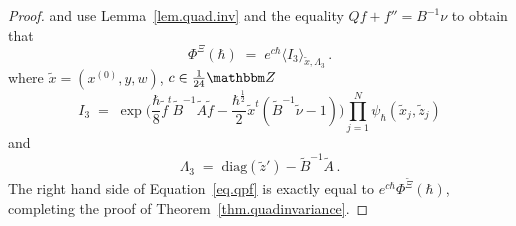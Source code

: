 \documentclass[12pt,reqno]{amsart}
\theoremstyle{definition}
\def\BZ{\mathbbm Z}
\def\be{\begin{equation}}
\def\ee{\end{equation}}
\def\diag{\mathrm{diag}}
\renewcommand{\=}{\;=\;}
\newcommand{\hsqrt}{\hbar^{\frac{1}{2}}}
\begin{document}
\begin{proof}
and use Lemma~\ref{lem.quad.inv} and
the equality $Qf+f''=B^{-1}\nu$
to obtain that 
\be
\label{eq.qpf}
\Phi^{\Xi}(\hbar) \= e^{c\hbar}\langle I_3 \rangle_{\widetilde{x}, \Lambda_3}\,.
\ee
where $\widetilde{x}=(x^{(0)},y,w)$, $c\in\frac{1}{24}\BZ$
\begin{equation*}
I_3 \= \exp\Big(\frac\hbar8 \widetilde{f}^t \widetilde{B}^{-1}\widetilde{A}
\widetilde{f}
-\frac{\hsqrt}2 \widetilde{x}^t(\widetilde{B}^{-1}\widetilde{\nu}-1)\Big)
\prod_{j=1}^N \psi_{\hbar}(\widetilde{x}_j,\widetilde{z}_j)
\end{equation*}
and
\begin{equation*}
\Lambda_3\=\diag(\widetilde{z}')-\widetilde{B}^{-1}\widetilde{A}\,.
\end{equation*}
The right hand side of Equation~\eqref{eq.qpf} is exactly equal to
$e^{c\hbar}\Phi^{\widetilde{\Xi}}(\hbar)$, completing the proof of
Theorem~\ref{thm.quadinvariance}.
\end{proof}
\end{document}
